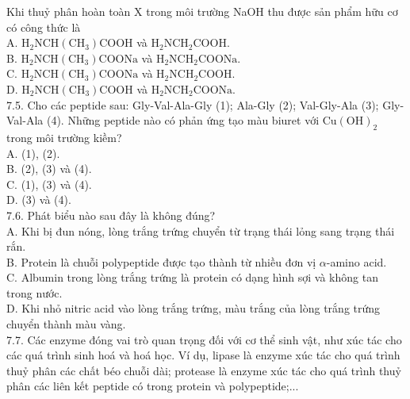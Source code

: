 \documentclass[10pt]{article}
\begin{document}
Khi thuỷ phân hoàn toàn X trong môi trường NaOH thu được sản phẩm hữu cơ có công thức là\\
A. $\mathrm{H}_{2} \mathrm{NCH}\left(\mathrm{CH}_{3}\right) \mathrm{COOH}$ và $\mathrm{H}_{2} \mathrm{NCH}_{2} \mathrm{COOH}$.\\
B. $\mathrm{H}_{2} \mathrm{NCH}\left(\mathrm{CH}_{3}\right) \mathrm{COONa}$ và $\mathrm{H}_{2} \mathrm{NCH}_{2} \mathrm{COONa}$.\\
C. $\mathrm{H}_{2} \mathrm{NCH}\left(\mathrm{CH}_{3}\right) \mathrm{COONa}$ và $\mathrm{H}_{2} \mathrm{NCH}_{2} \mathrm{COOH}$.\\
D. $\mathrm{H}_{2} \mathrm{NCH}\left(\mathrm{CH}_{3}\right) \mathrm{COOH}$ và $\mathrm{H}_{2} \mathrm{NCH}_{2} \mathrm{COONa}$.\\
7.5. Cho các peptide sau: Gly-Val-Ala-Gly (1); Ala-Gly (2); Val-Gly-Ala (3); Gly-Val-Ala (4). Những peptide nào có phản ứng tạo màu biuret với $\mathrm{Cu}(\mathrm{OH})_{2}$ trong môi trường kiềm?\\
A. (1), (2).\\
B. (2), (3) và (4).\\
C. (1), (3) và (4).\\
D. (3) và (4).\\
7.6. Phát biểu nào sau đây là không đúng?\\
A. Khi bị đun nóng, lòng trắng trứng chuyển từ trạng thái lỏng sang trạng thái rắn.\\
B. Protein là chuỗi polypeptide được tạo thành từ nhiều đơn vị $\alpha$-amino acid.\\
C. Albumin trong lòng trắng trứng là protein có dạng hình sợi và không tan trong nước.\\
D. Khi nhỏ nitric acid vào lòng trắng trứng, màu trắng của lòng trắng trứng chuyển thành màu vàng.\\
7.7. Các enzyme đóng vai trò quan trọng đối với cơ thể sinh vật, như xúc tác cho các quá trình sinh hoá và hoá học. Ví dụ, lipase là enzyme xúc tác cho quá trình thuỷ phân các chất béo chuỗi dài; protease là enzyme xúc tác cho quá trình thuỷ phân các liên kết peptide có trong protein và polypeptide;...
\end{document}
